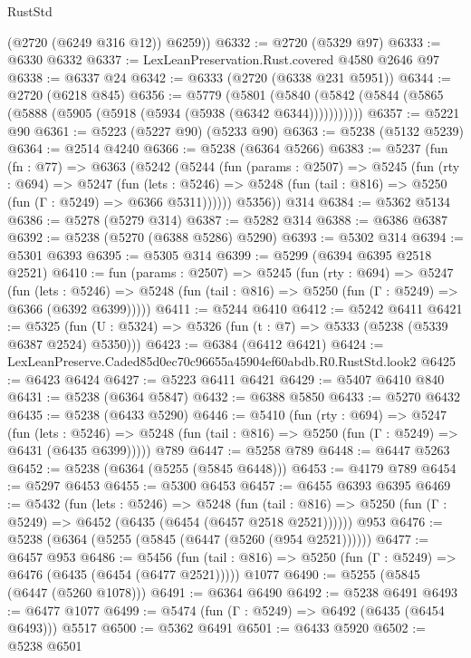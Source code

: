 \begin{lexlean}{RustStd}
\begin{coremodule}
        (@2720 (@6249 @316 @12))
        @6259))
@6332 := @2720 (@5329 @97)
@6333 := @6330 @6332
@6337 := LexLeanPreservation.Rust.covered @4580 @2646 @97
@6338 := @6337 @24
@6342 := @6333 (@2720 (@6338 @231 @5951))
@6344 := @2720 (@6218 @845)
@6356 := @5779
    (@5801 (@5840 (@5842 (@5844 (@5865 (@5888 (@5905 (@5918 (@5934 (@5938 (@6342 @6344)))))))))))
@6357 := @5221 @90
@6361 := @5223 (@5227 @90) (@5233 @90)
@6363 := @5238 (@5132 @5239)
@6364 := @2514 @4240
@6366 := @5238 (@6364 @5266)
@6383 := @5237
    (fun (fn : @77) =>
    @6363
      (@5242
        (@5244
          (fun (params : @2507) =>
          @5245
            (fun (rty : @694) =>
            @5247
              (fun (lets : @5246) =>
              @5248 (fun (tail : @816) => @5250 (fun (Γ : @5249) => @6366 @5311))))))
        @5356))
    @314
@6384 := @5362 @5134
@6386 := @5278 (@5279 @314)
@6387 := @5282 @314
@6388 := @6386 @6387
@6392 := @5238 (@5270 (@6388 @5286) @5290)
@6393 := @5302 @314
@6394 := @5301 @6393
@6395 := @5305 @314
@6399 := @5299 (@6394 @6395 @2518 @2521)
@6410 := fun (params : @2507) =>
  @5245
    (fun (rty : @694) =>
    @5247
      (fun (lets : @5246) =>
      @5248 (fun (tail : @816) => @5250 (fun (Γ : @5249) => @6366 (@6392 @6399)))))
@6411 := @5244 @6410
@6412 := @5242 @6411
@6421 := @5325 (fun (U : @5324) => @5326 (fun (t : @7) => @5333 (@5238 (@5339 @6387 @2524) @5350)))
@6423 := @6384 (@6412 @6421)
@6424 := LexLeanPreserve.Caded85d0ec70c96655a45904ef60abdb.R0.RustStd.look2
@6425 := @6423 @6424
@6427 := @5223 @6411 @6421
@6429 := @5407 @6410 @840
@6431 := @5238 (@6364 @5847)
@6432 := @6388 @5850
@6433 := @5270 @6432
@6435 := @5238 (@6433 @5290)
@6446 := @5410
    (fun (rty : @694) =>
    @5247
      (fun (lets : @5246) =>
      @5248 (fun (tail : @816) => @5250 (fun (Γ : @5249) => @6431 (@6435 @6399)))))
    @789
@6447 := @5258 @789
@6448 := @6447 @5263
@6452 := @5238 (@6364 (@5255 (@5845 @6448)))
@6453 := @4179 @789
@6454 := @5297 @6453
@6455 := @5300 @6453
@6457 := @6455 @6393 @6395
@6469 := @5432
    (fun (lets : @5246) =>
    @5248
      (fun (tail : @816) => @5250 (fun (Γ : @5249) => @6452 (@6435 (@6454 (@6457 @2518 @2521))))))
    @953
@6476 := @5238 (@6364 (@5255 (@5845 (@6447 (@5260 (@954 @2521))))))
@6477 := @6457 @953
@6486 := @5456
    (fun (tail : @816) => @5250 (fun (Γ : @5249) => @6476 (@6435 (@6454 (@6477 @2521)))))
    @1077
@6490 := @5255 (@5845 (@6447 (@5260 @1078)))
@6491 := @6364 @6490
@6492 := @5238 @6491
@6493 := @6477 @1077
@6499 := @5474 (fun (Γ : @5249) => @6492 (@6435 (@6454 @6493))) @5517
@6500 := @5362 @6491
@6501 := @6433 @5920
@6502 := @5238 @6501

\end{coremodule}
\end{lexlean}
